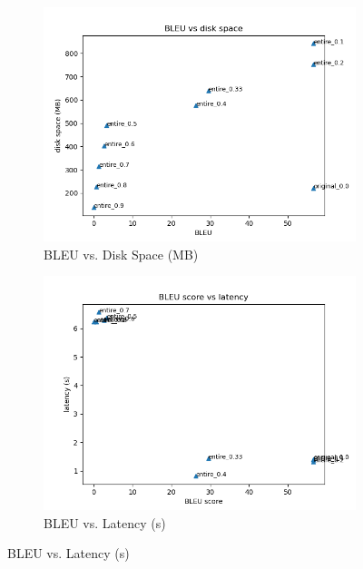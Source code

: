 \documentclass[11pt]{article}
\begin{document}
\begin{figure}[h!]
    \centering
    \begin{subfigure}{0.45\textwidth}
        \includegraphics[width=\textwidth]{images/prun_whole_model/BLEU_vs_disk_space.png}
        \caption{BLEU vs. Disk Space (MB)}
    \end{subfigure}
    \begin{subfigure}{0.45\textwidth}
        \includegraphics[width=\textwidth]{images/prun_whole_model/BLEU_vs_latency.png}
        \caption{BLEU vs. Latency (s)}
    \end{subfigure}


\end{figure}
\end{document}
